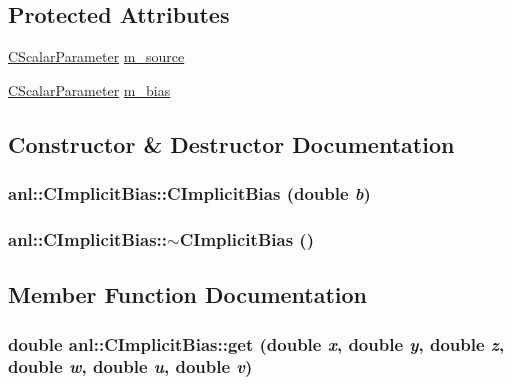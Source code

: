 \subsection*{Protected Attributes}
\begin{DoxyCompactItemize}
\item 
\hyperlink{classanl_1_1CScalarParameter}{CScalarParameter} \hyperlink{classanl_1_1CImplicitBias_a217301e5e28be9ff0918f54d3d8fa011}{m\_\-source}
\item 
\hyperlink{classanl_1_1CScalarParameter}{CScalarParameter} \hyperlink{classanl_1_1CImplicitBias_a9a11ff710d4551a7f58cc031390d0af5}{m\_\-bias}
\end{DoxyCompactItemize}


\subsection{Constructor \& Destructor Documentation}
\hypertarget{classanl_1_1CImplicitBias_a2af979ed5ee2312b332b7372e854d4be}{
\subsubsection[{CImplicitBias}]{\setlength{\rightskip}{0pt plus 5cm}anl::CImplicitBias::CImplicitBias (double {\em b})}}
\label{classanl_1_1CImplicitBias_a2af979ed5ee2312b332b7372e854d4be}
\hypertarget{classanl_1_1CImplicitBias_a8770e753c881794a6a59fa674c2fcfe9}{
\subsubsection[{$\sim$CImplicitBias}]{\setlength{\rightskip}{0pt plus 5cm}anl::CImplicitBias::$\sim$CImplicitBias ()}}
\label{classanl_1_1CImplicitBias_a8770e753c881794a6a59fa674c2fcfe9}


\subsection{Member Function Documentation}
\hypertarget{classanl_1_1CImplicitBias_a8ca95f9d44c9c86a4d79a08906d6b029}{
\subsubsection[{get}]{\setlength{\rightskip}{0pt plus 5cm}double anl::CImplicitBias::get (double {\em x}, \/  double {\em y}, \/  double {\em z}, \/  double {\em w}, \/  double {\em u}, \/  double {\em v})}}
\label{classanl_1_1CImplicitBias_a8ca95f9d44c9c86a4d79a08906d6b029}


